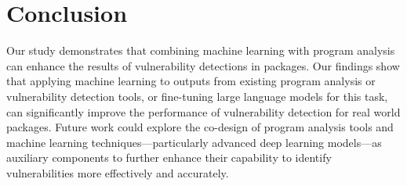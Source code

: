 \documentclass[12pt,openany,oneside,table]{cmuthesis}
\begin{document}
\section{Conclusion}
Our study demonstrates that combining machine learning with program analysis can enhance the results of vulnerability detections in \nodejs packages. 
Our findings show that applying machine learning to outputs from existing program analysis or vulnerability detection tools, or fine-tuning large language models for this task, can significantly improve the performance of vulnerability detection for real world \nodejs packages.
Future work could explore the co-design of program analysis tools and machine learning techniques---particularly advanced deep learning models---as auxiliary components to further enhance their capability to identify vulnerabilities more effectively and accurately.




\backmatter
\renewcommand{\bibsection}{\chapter{\bibname}}

 
\end{document}
